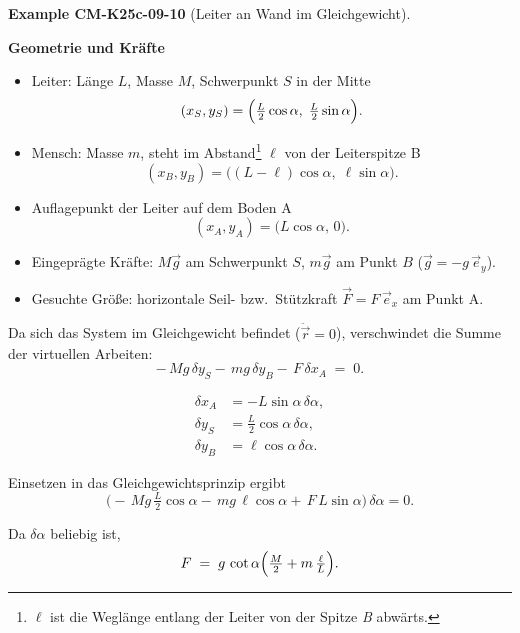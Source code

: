 \documentclass[10pt, letterpaper]{article}
\newcommand{\CustomHeading}[3]{%
  \par\medskip\noindent%
  \textbf{#1 #2} \textnormal{(#3)}.\enskip%
}
\newenvironment{EXA}[2]{\begin{unitbox}\CustomHeading{Example}{#1}{#2}}{\end{unitbox}}
\begin{document}
\begin{EXA}{CM-K25c-09-10}{Leiter an Wand im Gleichgewicht}
\textbf{Geometrie und Kräfte}

\begin{itemize}
\item Leiter: Länge $L$, Masse $M$, Schwerpunkt $S$ in der Mitte
      \[
        (x_S,y_S)=\Bigl(\tfrac{L}{2}\cos\alpha,\;\tfrac{L}{2}\sin\alpha\Bigr).
      \]
\item Mensch: Masse $m$, steht im Abstand\footnote{%
      $\ell$ ist die Weglänge entlang der Leiter von der Spitze
      \emph{B} abwärts.}  
      $\ell$ von der Leiter­spitze B
      \[
        (x_B,y_B)=\bigl((L-\ell)\cos\alpha,\;\ell\sin\alpha\bigr).
      \]
\item Auflagepunkt der Leiter auf dem Boden A
      \[
        (x_A,y_A)=\bigl(L\cos\alpha,\,0\bigr).
      \]
\item Eingeprägte Kräfte: 
      $M\vec g$ am Schwerpunkt $S$,  
      $m\vec g$ am Punkt $B$  
      ($\vec g=-g\,\vec e_y$).
\item Gesuchte Größe: horizontale Seil- bzw.\ Stütz­kraft
      $\vec F = F\,\vec e_x$ am Punkt A.
\end{itemize}

Da sich das System im Gleichgewicht befindet ($\ddot{\vec r}=0$),
verschwindet die Summe der virtuellen Arbeiten:
\[
  -\,Mg\,\delta y_S
  -\,mg\,\delta y_B
  -\,F\,\delta x_A
  \;=\;0 .
\]

\[
\begin{aligned}
  \delta x_A &= -L\sin\alpha\,\delta\alpha,\\
  \delta y_S &= \tfrac{L}{2}\cos\alpha\,\delta\alpha,\\
  \delta y_B &= \ell\cos\alpha\,\delta\alpha.
\end{aligned}
\]

Einsetzen in das Gleichgewichtsprinzip ergibt
\[
  \bigl(
    -\,Mg\,\tfrac{L}{2}\cos\alpha
    -\,mg\,\ell\cos\alpha
    +\,F\,L\sin\alpha
  \bigr)\,\delta\alpha = 0.
\]

Da $\delta\alpha$ beliebig ist,
\[
  F
  \;=\;
  g\,\cot\alpha
  \Bigl(\tfrac{M}{2} + m\,\tfrac{\ell}{L}\Bigr).
\]


\end{EXA}
\end{document}
